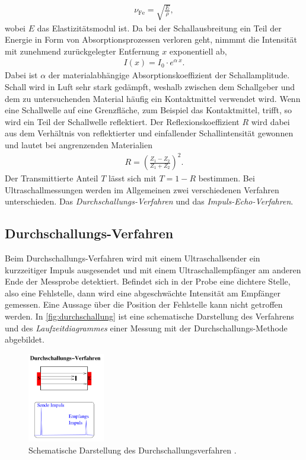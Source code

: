 \begin{align}
    \label{eqn:SchallFest}
    \nu_{\text{Fe}} = \sqrt{\frac E\rho},
\end{align}
wobei $E$ das Elastizitätsmodul ist. Da bei der Schallausbreitung ein Teil der Energie in Form von Absorptionsprozessen verloren geht, nimmmt die Intensität mit zunehmend zurückgelegter Entfernung $x$ exponentiell ab,
\begin{align}
    \label{eqn:intensitaetsverlust}
    I(x)=I_0\cdot e^{\alpha ~ x}.
\end{align}
Dabei ist $\alpha$ der materialabhängige Absorptionskoeffizient der Schallamplitude. \newline
Schall wird in Luft sehr stark gedämpft, weshalb zwischen dem Schallgeber und dem zu untersuchenden Material häufig ein Kontaktmittel verwendet wird. Wenn eine Schallwelle auf eine Grenzfläche, zum Beispiel das Kontaktmittel, trifft, so wird
ein Teil der Schallwelle reflektiert. Der Reflexionskoeffizient $R$ wird dabei aus dem Verhältnis von reflektierter und einfallender Schallintensität gewonnen und lautet bei angrenzenden Materialien
\begin{align}
    \label{eqn:Reflexionskoeffizient}
    R=\left(\frac{Z_1-Z_2}{Z_1+Z_2}\right)^2.
\end{align}
Der Transmittierte Anteil $T$ lässt sich mit $T=1-R$ bestimmen. \newline
Bei Ultraschallmessungen werden im Allgemeinen zwei verschiedenen Verfahren unterschieden. Das \textit{Durchschallungs-Verfahren} und das \textit{Impuls-Echo-Verfahren}.

\subsection*{Durchschallungs-Verfahren}
\label{subsec:durchschallungVerfahren}
Beim Durchschallungs-Verfahren wird mit einem Ultraschallsender ein kurzzeitiger Impuls ausgesendet und mit einem Ultraschallempfänger am anderen Ende der Messprobe detektiert.
Befindet sich in der Probe eine dichtere Stelle, also eine Fehlstelle, dann wird eine abgeschwächte Intensität am Empfänger gemessen. Eine Aussage über die Position der Fehlstelle kann nicht getroffen werden.
In \autoref{fig:durchschallung} ist eine schematische Darstellung des Verfahrens und des \textit{Laufzeitdiagrammes} einer Messung mit der Durchschallungs-Methode abgebildet.

\begin{figure}[H]
    \centering
    \includegraphics[width=0.3\textwidth]{data/Durchschallungsverfahren.png}
    \caption{Schematische Darstellung des Durchschallungsverfahren \cite{AnleitungUS2}.}
    \label{fig:durchschallung}
\end{figure}


